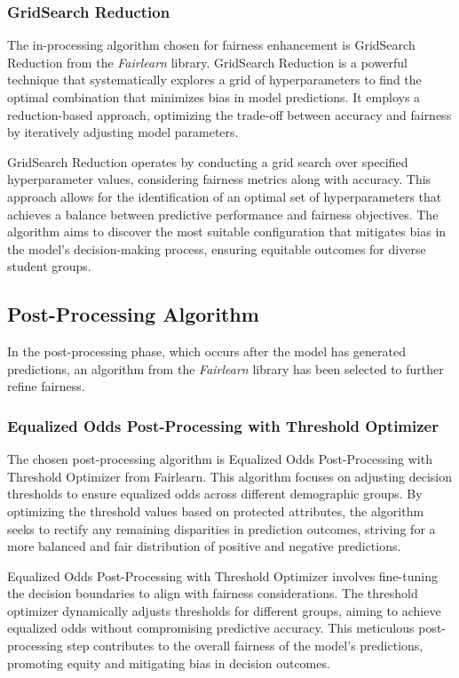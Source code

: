 \documentclass[12pt,a4paper,openright,twoside]{book}
\begin{document}
\subsubsection{GridSearch Reduction}

The in-processing algorithm chosen for fairness enhancement is GridSearch Reduction from the \emph{Fairlearn} library. GridSearch Reduction is a powerful technique that systematically explores a grid of hyperparameters to find the optimal combination that minimizes bias in model predictions. It employs a reduction-based approach, optimizing the trade-off between accuracy and fairness by iteratively adjusting model parameters.

GridSearch Reduction operates by conducting a grid search over specified hyperparameter values, considering fairness metrics along with accuracy. This approach allows for the identification of an optimal set of hyperparameters that achieves a balance between predictive performance and fairness objectives. The algorithm aims to discover the most suitable configuration that mitigates bias in the model's decision-making process, ensuring equitable outcomes for diverse student groups. \cite{agarwal2018reductions}

\subsection{Post-Processing Algorithm}

In the post-processing phase, which occurs after the model has generated predictions, an algorithm from the \emph{Fairlearn} library has been selected to further refine fairness.

\subsubsection{Equalized Odds Post-Processing with Threshold Optimizer}

The chosen post-processing algorithm is Equalized Odds Post-Processing with Threshold Optimizer from Fairlearn. This algorithm focuses on adjusting decision thresholds to ensure equalized odds across different demographic groups. By optimizing the threshold values based on protected attributes, the algorithm seeks to rectify any remaining disparities in prediction outcomes, striving for a more balanced and fair distribution of positive and negative predictions. \cite{10.5555/3157382.3157469}

Equalized Odds Post-Processing with Threshold Optimizer involves fine-tuning the decision boundaries to align with fairness considerations. The threshold optimizer dynamically adjusts thresholds for different groups, aiming to achieve equalized odds without compromising predictive accuracy. This meticulous post-processing step contributes to the overall fairness of the model's predictions, promoting equity and mitigating bias in decision outcomes. 
\end{document}
